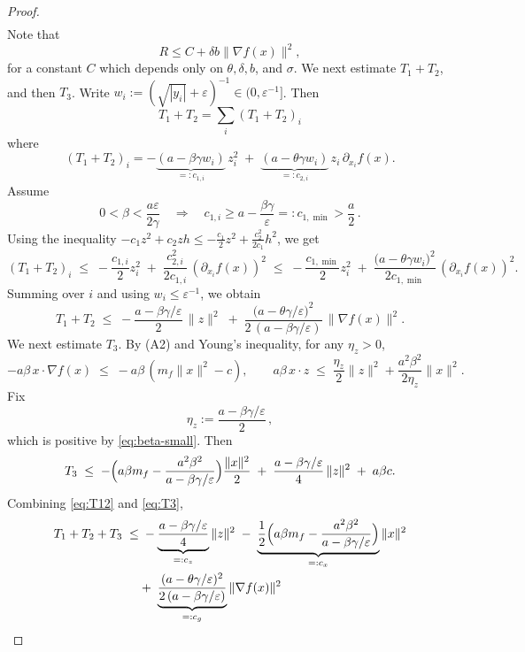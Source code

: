 \documentclass[11pt, a4paper,leqno]{amsart}
\theoremstyle{definition}
\numberwithin{equation}{section}
\begin{document}
\begin{proof}
\begin{align*}
\end{align*}
Note that
$$R\leq C+ {\delta b}\|\nabla f(x)\|^2,$$
for a constant $C$ which depends only on $\theta, \delta, b$, and $\sigma$.  We next estimate $T_1+T_2$, and then $T_3$. Write $w_i:= (\sqrt{|y_i|}+\varepsilon)^{-1}\in(0,\varepsilon^{-1}]$. Then
$$T_1+T_2=\sum_i(T_1+T_2)_i$$
where
\[
(T_1+T_2)_i= -\underbrace{(a-\beta\gamma w_i)}_{=:c_{1,i}}\,z_i^2
\;+\;\underbrace{(a-\theta\gamma w_i)}_{=:c_{2,i}}\,z_i\,\partial_{x_i}f(x).
\]
Assume
\begin{equation}\label{eq:beta-small}
0<\beta<\frac{a\varepsilon}{2\gamma}\quad\Longrightarrow\quad c_{1,i}\ge a-\frac{\beta\gamma}{\varepsilon}=:c_{1,\min}>\frac{a}{2}\,.
\end{equation}
Using the inequality $-c_1 z^2+c_2 zh\le -\tfrac{c_1}{2}z^2+\tfrac{c_2^2}{2c_1}h^2$, we get
\[
(T_1+T_2)_i \;\le\; -\frac{c_{1,i}}{2}z_i^2 \;+\; \frac{c_{2,i}^2}{2c_{1,i}}\,(\partial_{x_i}f(x))^2
\;\le\; -\frac{c_{1,\min}}{2}z_i^2 \;+\; \frac{\bigl(a-\theta\gamma w_i\bigr)^2}{2c_{1,\min}}\,(\partial_{x_i}f(x))^2.
\]
Summing over $i$ and using $w_i\le\varepsilon^{-1}$, we obtain
\begin{equation}\label{eq:T12}
T_1+T_2 \;\le\; -\frac{a-\beta\gamma/\varepsilon}{2}\,\|z\|^2
\;+\; \frac{\bigl(a-\theta\gamma/\varepsilon\bigr)^2}{2\,(a-\beta\gamma/\varepsilon)}\,\|\nabla f(x)\|^2.
\end{equation}
We next estimate $T_3$. By (A2) and Young’s inequality, for any $\eta_z>0$,
\[
-a\beta\,x\cdot\nabla f(x)\;\le\;-a\beta\,(m_f\|x\|^2-c),
\qquad
a\beta\,x\cdot z\;\le\;\frac{\eta_z}{2}\|z\|^2+\frac{a^2\beta^2}{2\eta_z}\|x\|^2.
\]
Fix
\begin{equation}\label{eq:eta-choice}
\eta_z:=\frac{a-\beta\gamma/\varepsilon}{2}\,,
\end{equation}
which is positive by \eqref{eq:beta-small}. Then
\begin{equation}\label{eq:T3}
T_3 \;\le\; -\Bigl(a\beta m_f-\frac{a^2\beta^2}{a-\beta\gamma/\varepsilon}\Bigr)\frac{\|x\|^2}{2}
\;+\; \frac{a-\beta\gamma/\varepsilon}{4}\,\|z\|^2 \;+\; a\beta c.
\end{equation}
Combining \eqref{eq:T12} and \eqref{eq:T3},
\begin{align}\label{eq:T123}
T_1+T_2+T_3
\;\le&\; -\underbrace{\frac{a-\beta\gamma/\varepsilon}{4}}_{=:c_z}\|z\|^2
\;-\;\underbrace{\frac{1}{2}\Bigl(a\beta m_f-\frac{a^2\beta^2}{a-\beta\gamma/\varepsilon}\Bigr)}_{=:c_x}\|x\|^2\notag\\
\;&+\;\underbrace{\frac{(a-\theta\gamma/\varepsilon)^2}{2\,(a-\beta\gamma/\varepsilon)}}_{=:c_g}\|\nabla f(x)\|^2

\end{align}
\end{proof}
\end{document}
